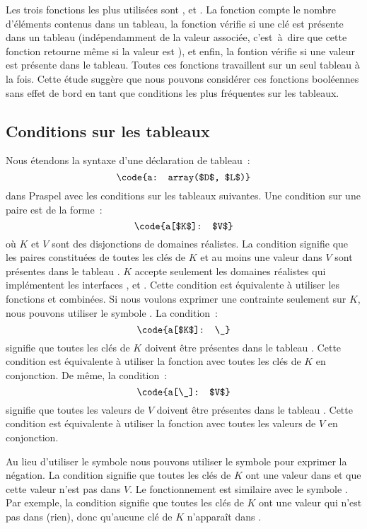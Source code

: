 %
Les trois fonctions les plus utilisées sont ,
 et . La fonction 
compte le nombre d'éléments contenus dans un tableau, la fonction
 vérifie si une clé est présente dans un tableau
(indépendamment de la valeur associée, c'est~à~dire que cette fonction retourne
 même si la valeur est ), et enfin, la fontion
 vérifie si une valeur est présente dans le tableau. Toutes
ces fonctions travaillent sur un seul tableau à la fois. Cette étude suggère que
nous pouvons considérer ces fonctions booléennes sans effet de bord en tant que
conditions les plus fréquentes sur les tableaux.

\subsection{Conditions sur les tableaux}

Nous étendons la syntaxe d'une déclaration de tableau~:
%
$$\code{a: array($D$, $L$)}$$
%
dans Praspel avec les conditions sur les tableaux suivantes. Une condition sur
une paire est de la forme~:
%
$$\code{a[$K$]: $V$}$$
%
où $K$ et $V$ sont des disjonctions de domaines réalistes. La condition signifie
que les paires constituées de toutes les clés de $K$ et au moins une valeur dans
$V$ sont présentes dans le tableau . $K$ accepte seulement les domaines
réalistes qui implémentent les interfaces ,  et
. Cette condition est équivalente à utiliser les fonctions
 et  combinées. Si nous voulons
exprimer une contrainte seulement sur $K$, nous pouvons utiliser le symbole
\code{\_}. La condition~:
%
$$\code{a[$K$]: \_}$$
%
signifie que toutes les clés de $K$ doivent être présentes dans le tableau
. Cette condition est équivalente à utiliser la fonction
 avec toutes les clés de $K$ en conjonction. De même,
la condition~:
%
$$\code{a[\_]: $V$}$$
%
signifie que toutes les valeurs de $V$ doivent être présentes dans le tableau
. Cette condition est équivalente à utiliser la fonction
 avec toutes les valeurs de $V$ en conjonction.

Au lieu d'utiliser le symbole \code{:} nous pouvons utiliser le symbole
\code{!:} pour exprimer la négation. La condition  signifie
que toutes les clés de $K$ ont une valeur dans  et que cette valeur
n'est pas dans $V$. Le fonctionnement est similaire avec le symbole \code{\_}.
Par exemple, la condition  signifie que toutes les clés de $K$
ont une valeur qui n'est pas dans \code{\_} (rien), donc qu'aucune clé de $K$
n'apparaît dans .

